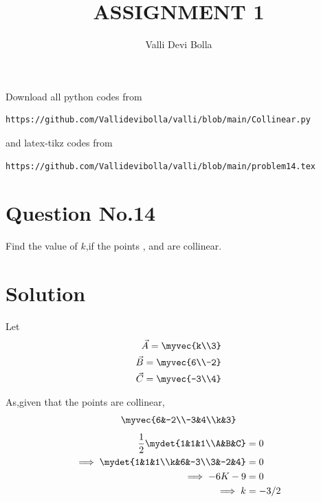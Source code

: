\documentclass[journal,12pt,twocolumn]{IEEEtran}
\begin{document}
\def\rightbox#1{\makebox[0in][r]{#1}}
\def\centbox#1{\makebox[0in]{#1}}
\def\topbox#1{\raisebox{-\baselineskip}[0in][0in]{#1}}
\def\midbox#1{\raisebox{-0.5\baselineskip}[0in][0in]{#1}}
\vspace{3cm}
\title{ASSIGNMENT 1}
\author{Valli Devi Bolla}
\maketitle
\newpage
\bigskip
\renewcommand{\thefigure}{\theenumi}
\renewcommand{\thetable}{\theenumi}
Download all python codes from
\begin{lstlisting}
https://github.com/Vallidevibolla/valli/blob/main/Collinear.py
\end{lstlisting}
%
and latex-tikz codes from
%
\begin{lstlisting}
https://github.com/Vallidevibolla/valli/blob/main/problem14.tex
\end{lstlisting}
%
\section{Question No.14}
Find the value of $k$,if the points , 
 and  are collinear.
\section{Solution}
Let
\begin{align}
\vec{A}=\myvec{k\\3} \\
\vec{B}=\myvec{6\\-2}\\
\vec{C}=\myvec{-3\\4}
\end{align}
 
As,given that the points are collinear,
\begin{align}
\myvec{6&-2\\-3&4\\k&3}
\end{align}
\begin{align}
\frac{1}{2}\mydet{1&1&1\\A&B&C}&=0\\
\implies\mydet{1&1&1\\k&6&-3\\3&-2&4}&=0\\
\implies -6K-9&=0\\
\implies {k}&={-3/2}
\end{align}
\end{document}
